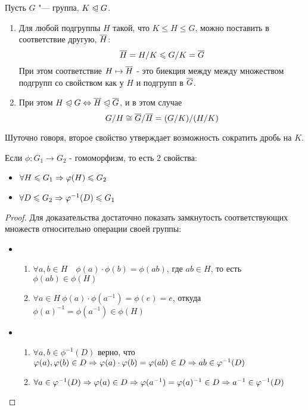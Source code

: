 \begin{theorem}
	Пусть $G$ "--- группа, $K \trianglelefteqslant G$. 
	\begin{enumerate}
		\item Для любой подгруппы $H$ такой, что $K \le H \le G$, можно поставить в соответствие другую, $\overline{H}$:
		\[
			\overline{H} = H / K \leqslant G / K = \overline{G}
		\]
		При этом соответствие $H \mapsto \overline{H}$ - это биекция между между множеством подгрупп со свойством как у $H$ и подгрупп в $\overline{G}$.
		
		\item При этом $H \trianglelefteqslant G \Leftrightarrow \overline{H} \trianglelefteqslant \overline{G}$, и в этом случае
		\[
			G / H \cong \overline{G} / \overline{H} = (G / K) / (H / K)
		\]
	\end{enumerate}
\end{theorem}

\begin{note}
	Шуточно говоря, второе свойство утверждает возможность сократить дробь на $K$.
\end{note}

\begin{proposition}
	Если $\phi \colon G_1 \to G_2$ - гомоморфизм, то есть 2 свойства:
	\begin{itemize}
		\item \(\forall H \leqslant G_1 \Rightarrow \varphi(H) \leqslant G_2\)
		
		\item \(\forall D \leqslant G_2 \Rightarrow \varphi^{-1}(D) \leqslant G_1\)
	\end{itemize}
\end{proposition}

\begin{proof}
	Для доказательства достаточно показать замкнутость соответствующих множеств относительно операции своей группы:
	\begin{itemize}
		\item \begin{enumerate}
			\item \(\forall a, b \in H \quad \phi(a) \cdot \phi(b) = \phi(ab)\), где $ab \in H$, то есть $\phi(ab) \in \phi(H)$
			
			\item \(\forall a \in H\ \phi(a) \cdot \phi(a^{-1}) = \phi(e) = e\), откуда $\phi(a)^{-1} = \phi(a^{-1}) \in \phi(H)$
		\end{enumerate}
		
		\item \begin{enumerate}
			\item \(\forall a, b \in \phi^{-1}(D)\) верно, что $\varphi(a), \varphi(b) \in D \Rightarrow \varphi(a) \cdot \varphi(b) = \varphi(ab) \in D \Rightarrow ab \in \varphi^{-1}(D)$
			
			\item \(\forall a \in \varphi^{-1}(D) \Rightarrow \varphi(a) \in D \Rightarrow \varphi(a^{-1}) = \varphi(a)^{-1} \in D \Rightarrow a^{-1} \in \varphi^{-1}(D)\)
		\end{enumerate}
	\end{itemize}
\end{proof}

